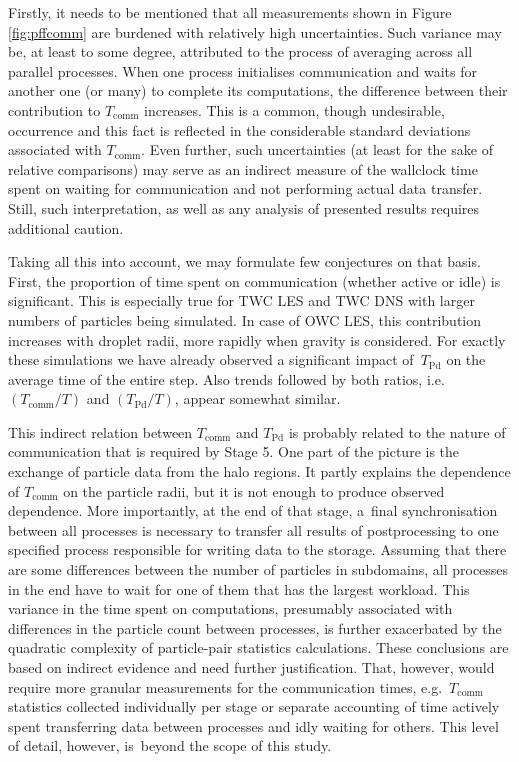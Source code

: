 \documentclass{pracamgren}
\begin{document}
Firstly, it needs to be mentioned that all measurements shown in Figure \ref{fig:pffcomm} are burdened with relatively high uncertainties.
Such variance may be, at least to some degree, attributed to the process of averaging across all parallel processes.
When one process initialises communication and waits for another one (or many) to complete its computations, the difference between their contribution to $T_{\text{comm}}$ increases.
This is a common, though undesirable, occurrence and this fact is reflected in the considerable standard deviations associated with $T_{\text{comm}}$.
Even further, such uncertainties (at least for the sake of relative comparisons) may serve as an indirect measure of the wallclock time spent on waiting for communication and not performing actual data transfer.
Still, such interpretation, as well as any analysis of presented results requires additional caution.

Taking all this into account, we may formulate few conjectures on that basis.
First, the proportion of time spent on communication (whether active or idle) is significant.
This is especially true for TWC LES and TWC DNS with larger numbers of particles being simulated.
In case of OWC LES, this contribution increases with droplet radii, more rapidly when gravity is considered.
For exactly these simulations we have already observed a significant impact of~$T_{\text{Pd}}$ on the average time of the entire step.
Also trends followed by both ratios, i.e.~$(T_{\text{comm}} / T)$ and $(T_{\text{Pd}} / T)$, appear somewhat similar.

This indirect relation between $T_{\text{comm}}$ and $T_{\text{Pd}}$ is probably related to the nature of communication that is required by Stage 5.
One part of the picture is the exchange of particle data from the halo regions.
It partly explains the dependence of $T_{\text{comm}}$ on the particle radii, but it is not enough to produce observed dependence.
More importantly, at the end of that stage, a~final synchronisation between all processes is necessary to transfer all results of postprocessing to one specified process responsible for writing data to the storage.
Assuming that there are some differences between the number of particles in subdomains, all processes in the end have to wait for one of them that has the largest workload.
This variance in the time spent on computations, presumably associated with differences in the particle count between processes, is further exacerbated by the quadratic complexity of particle-pair statistics calculations.
These conclusions are based on indirect evidence and need further justification.
That, however, would require more granular measurements for the communication times, e.g.~$T_{\text{comm}}$ statistics collected individually per stage or separate accounting of time actively spent transferring data between processes and idly waiting for others.
This level of detail, however, is~beyond the scope of this study.
\end{document}

